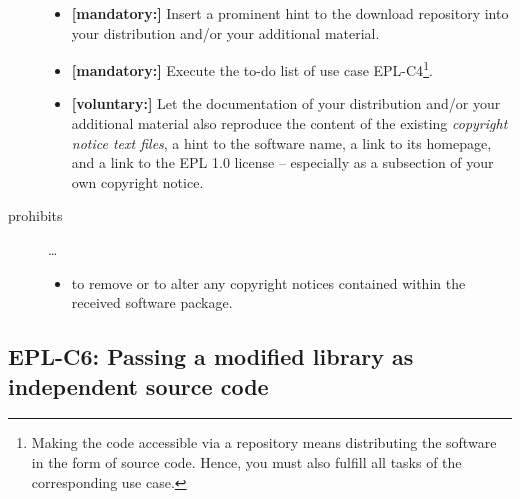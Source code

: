 \begin{description}
\begin{itemize}
  \item \textbf{[mandatory:]} Insert a prominent hint to the download repository
  into your distribution and/or your additional material.

  \item \textbf{[mandatory:]} Execute the to-do list of use case EPL-C4\footnote{
  Making the code accessible via a repository means distributing the software in
  the form of source code. Hence, you must also fulfill all tasks of the
  corresponding use case.}.
 
  \item \textbf{[voluntary:]} Let the documentation of your distribution and/or
  your additional material  also reproduce the content of the existing
  \emph{copyright notice text files}, a hint to the software name, a link to its
  homepage, and a link to the EPL 1.0 license -- especially as a subsection of
  your own copyright notice.


\end{itemize}  

\item[prohibits] \ldots
\begin{itemize}
  \item to remove or to alter any copyright notices contained within the
  received software package.
\end{itemize}

\end{description}

\subsection{EPL-C6: Passing a modified library as independent source code}
\label{OSUC-08S-EPL}

